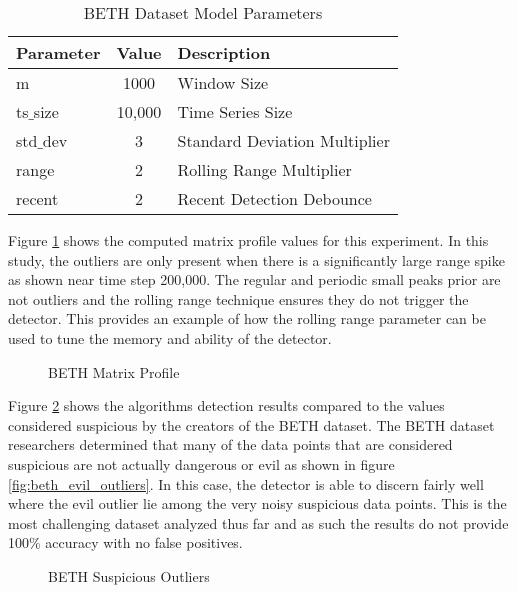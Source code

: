 \begin{table}[H]
\caption{BETH Dataset Model Parameters}
\begin{tabular}{|l|c|l|}
    \hline
	\textbf{Parameter} & \textbf{Value} & \textbf{Description} \\ \hline
	m & 1000 & Window Size \\ \hline
	ts$\_$size & 10,000 & Time Series Size \\ \hline
	std$\_$dev & 3 & Standard Deviation Multiplier \\ \hline
	range & 2 & Rolling Range Multiplier\\ \hline
	recent & 2 & Recent Detection Debounce\\ \hline
\end{tabular}
\label{tab:beth_sim_params}
\end{table}

Figure \ref{fig:beth_mp_hist} shows the computed matrix profile values for this experiment. In this study, the outliers are only present when there is a significantly large range spike as shown near time step 200,000. The regular and periodic small peaks prior are not outliers and the rolling range technique ensures they do not trigger the detector. This provides an example of how the rolling range parameter can be used to tune the memory and ability of the detector. 

\begin{figure}[H]
    
    \caption{BETH Matrix Profile}
    \label{fig:beth_mp_hist}
\end{figure}

Figure \ref{fig:beth_sus_outliers} shows the algorithms detection results compared to the values considered suspicious by the creators of the BETH dataset. The BETH dataset researchers determined that many of the data points that are considered suspicious are not actually dangerous or evil as shown in figure \ref{fig:beth_evil_outliers}. In this case, the detector is able to discern fairly well where the evil outlier lie among the very noisy suspicious data points. This is the most challenging dataset analyzed thus far and as such the results do not provide 100\% accuracy with no false positives.

 \begin{figure}[H]
    
    \caption{BETH Suspicious Outliers}
    \label{fig:beth_sus_outliers}
\end{figure}

